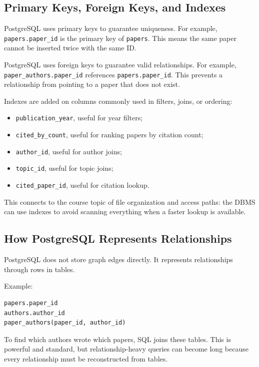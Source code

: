 \documentclass[11pt]{article}
\begin{document}
\subsection{Primary Keys, Foreign Keys, and Indexes}

PostgreSQL uses primary keys to guarantee uniqueness.
For example, \texttt{papers.paper\_id} is the primary key of \texttt{papers}.
This means the same paper cannot be inserted twice with the same ID.

PostgreSQL uses foreign keys to guarantee valid relationships.
For example, \texttt{paper\_authors.paper\_id} references \texttt{papers.paper\_id}.
This prevents a relationship from pointing to a paper that does not exist.

Indexes are added on columns commonly used in filters, joins, or ordering:

\begin{itemize}
    \item \texttt{publication\_year}, useful for year filters;
    \item \texttt{cited\_by\_count}, useful for ranking papers by citation count;
    \item \texttt{author\_id}, useful for author joins;
    \item \texttt{topic\_id}, useful for topic joins;
    \item \texttt{cited\_paper\_id}, useful for citation lookup.
\end{itemize}

This connects to the course topic of file organization and access paths:
the DBMS can use indexes to avoid scanning everything when a faster lookup is available.

\subsection{How PostgreSQL Represents Relationships}

PostgreSQL does not store graph edges directly.
It represents relationships through rows in tables.

Example:

\begin{verbatim}
papers.paper_id
authors.author_id
paper_authors(paper_id, author_id)
\end{verbatim}

To find which authors wrote which papers, SQL joins these tables.
This is powerful and standard, but relationship-heavy queries can become long because every relationship must be reconstructed from tables.
\end{document}
